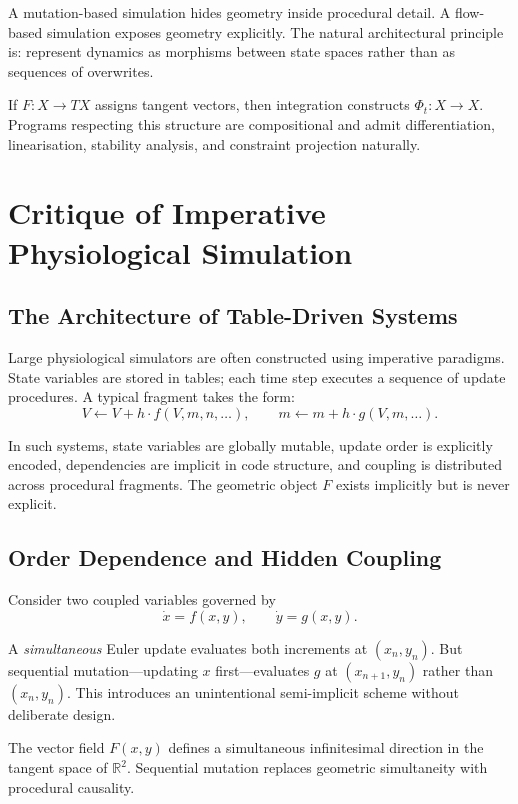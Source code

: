 \documentclass[12pt,openany]{book}
\newcommand{\R}{\mathbb{R}}
\begin{document}
A mutation-based simulation hides geometry inside procedural detail. A
flow-based simulation exposes geometry explicitly. The natural architectural
principle is: represent dynamics as morphisms between state spaces rather than
as sequences of overwrites.

If $F:X\to TX$ assigns tangent vectors, then integration constructs
$\Phi_t:X\to X$. Programs respecting this structure are compositional and
admit differentiation, linearisation, stability analysis, and constraint
projection naturally.

\chapter{Critique of Imperative Physiological Simulation}
\label{ch:critique}

\section{The Architecture of Table-Driven Systems}

Large physiological simulators are often constructed using imperative paradigms.
State variables are stored in tables; each time step executes a sequence of
update procedures. A typical fragment takes the form:
\[
  V \leftarrow V + h\cdot f(V,m,n,\dots), \qquad
  m \leftarrow m + h\cdot g(V,m,\dots).
\]

In such systems, state variables are globally mutable, update order is
explicitly encoded, dependencies are implicit in code structure, and coupling is
distributed across procedural fragments. The geometric object $F$ exists
implicitly but is never explicit.

\section{Order Dependence and Hidden Coupling}

Consider two coupled variables governed by
\[
  \dot x = f(x,y), \qquad \dot y = g(x,y).
\]

A \emph{simultaneous} Euler update evaluates both increments at $(x_n,y_n)$.
But sequential mutation—updating $x$ first—evaluates $g$ at $(x_{n+1},y_n)$
rather than $(x_n,y_n)$. This introduces an unintentional semi-implicit scheme
without deliberate design.

\begin{remark}
  The vector field $F(x,y)$ defines a simultaneous infinitesimal direction in
  the tangent space of $\R^2$. Sequential mutation replaces geometric
  simultaneity with procedural causality.
\end{remark}
\end{document}
